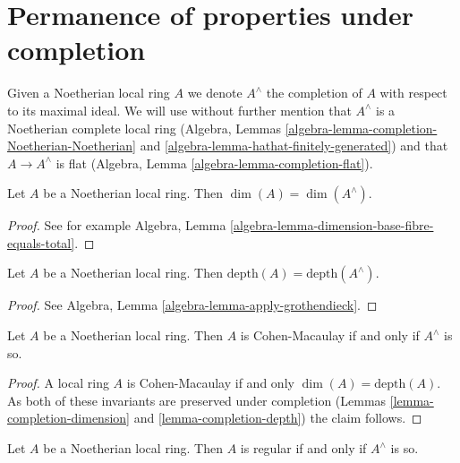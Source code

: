\section{Permanence of properties under completion}
\label{section-permanence-completion}

\noindent
Given a Noetherian local ring $A$ we denote $A^\wedge$ the completion of
$A$ with respect to its maximal ideal. We will use without further mention
that $A^\wedge$ is a Noetherian complete local ring
(Algebra, Lemmas \ref{algebra-lemma-completion-Noetherian-Noetherian} and
\ref{algebra-lemma-hathat-finitely-generated})
and that $A \to A^\wedge$ is flat
(Algebra, Lemma \ref{algebra-lemma-completion-flat}).

\begin{lemma}
\label{lemma-completion-dimension}
Let $A$ be a Noetherian local ring.
Then $\dim(A) = \dim(A^\wedge)$.
\end{lemma}

\begin{proof}
See for example
Algebra, Lemma \ref{algebra-lemma-dimension-base-fibre-equals-total}.
\end{proof}

\begin{lemma}
\label{lemma-completion-depth}
Let $A$ be a Noetherian local ring. Then
$\text{depth}(A) = \text{depth}(A^\wedge)$.
\end{lemma}

\begin{proof}
See Algebra, Lemma \ref{algebra-lemma-apply-grothendieck}.
\end{proof}

\begin{lemma}
\label{lemma-completion-CM}
Let $A$ be a Noetherian local ring.
Then $A$ is Cohen-Macaulay if and only if $A^\wedge$ is so.
\end{lemma}

\begin{proof}
A local ring $A$ is Cohen-Macaulay if and only $\dim(A) = \text{depth}(A)$.
As both of these invariants are preserved under completion
(Lemmas \ref{lemma-completion-dimension} and \ref{lemma-completion-depth})
the claim follows.
\end{proof}

\begin{lemma}
\label{lemma-completion-regular}
Let $A$ be a Noetherian local ring.
Then $A$ is regular if and only if $A^\wedge$ is so.
\end{lemma}

